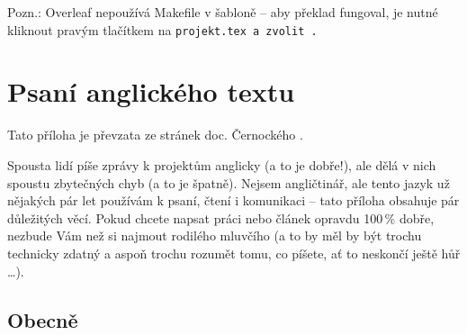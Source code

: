 Pozn.: Overleaf nepoužívá Makefile v šabloně -- aby překlad fungoval, je nutné kliknout pravým tlačítkem na \tt projekt.tex \rm a zvolit .

\chapter{Psaní anglického textu}
\label{anglicky}
Tato příloha je převzata ze stránek doc. Černockého \cite{CernockyEnglish}.

Spousta lidí píše zprávy k projektům anglicky (a to je dobře!), ale dělá v nich spoustu zbytečných chyb (a to je špatně). Nejsem angličtinář, ale tento jazyk už nějakých pár let používám k psaní, čtení i komunikaci -- tato příloha obsahuje pár důležitých věcí. Pokud chcete napsat práci nebo článek opravdu 100\,\% dobře, nezbude Vám než si najmout rodilého mluvčího (a to by měl by být trochu technicky zdatný a aspoň trochu rozumět tomu, co píšete, ať to neskončí ještě hůř \ldots).

\section*{Obecně}

